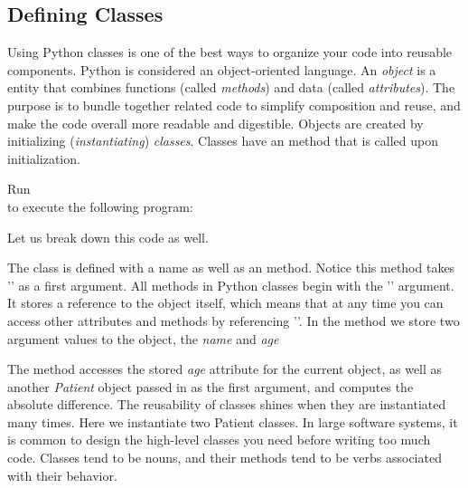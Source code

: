 \subsection{Defining Classes}

Using Python classes is one of the best ways to organize your code into reusable components.
Python is considered an object-oriented language.
An \textit{object} is a entity that combines functions (called \textit{methods}) and data (called \textit{attributes}).
The purpose is to bundle together related code to simplify composition and reuse, and make the code overall more readable and digestible.
Objects are created by initializing (\textit{instantiating}) \textit{classes}.
Classes have an  method that is called upon initialization.

Run \\ to execute the following program:


Let us break down this code as well.

The class is defined with a name as well as an  method.
Notice this method takes '' as a first argument.
All methods in Python classes begin with the '' argument.
It stores a reference to the object itself, which means that at any time you can access other attributes and methods by referencing ''.
In the  method we store two argument values to the object, the \textit{name} and \textit{age}

The  method accesses the stored \textit{age} attribute for the current object, as well as another \textit{Patient} object passed in as the first argument, and computes the absolute difference.
The reusability of classes shines when they are instantiated many times. Here we instantiate two Patient classes.
In large software systems, it is common to design the high-level classes you need before writing too much code.
Classes tend to be nouns, and their methods tend to be verbs associated with their behavior.




